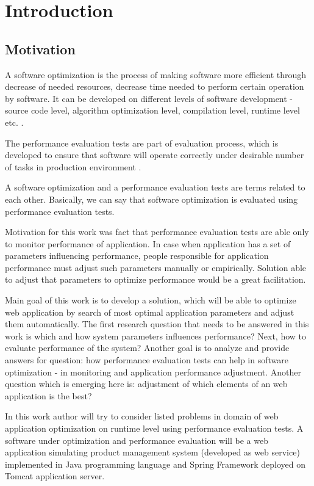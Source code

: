 \documentclass[12pt,a4paper]{article}
\begin{document}

\section{Introduction} \label{section:introduction}

\subsection{Motivation}

A software optimization is the process of making software more efficient through decrease of needed resources, decrease time needed to perform certain operation by software. It can be developed on different levels of software development - source code level, algorithm optimization level, compilation level, runtime level etc. \cite{javaperformance}\cite{optimizationtheory}.

The performance evaluation tests are part of evaluation process, which is developed to ensure that software will operate correctly under desirable number of tasks in production environment \cite{analysisofpet}.   

A software optimization and a performance evaluation tests are terms related to each other. Basically, we can say that software optimization is evaluated using performance evaluation tests. 

Motivation for this work was fact that performance evaluation tests are able only to monitor performance of application. In case when application has a set of parameters influencing performance, people responsible for application performance must adjust such parameters manually or empirically. Solution able to adjust that parameters to optimize performance would be a great facilitation. 

Main goal of this work is to develop a solution, which will be able to optimize web application by search of most optimal application parameters and adjust them automatically. The first research question that needs to be answered in this work is which and how system parameters influences performance? Next, how to evaluate performance of the system? Another goal is to analyze and provide answers for question: how performance evaluation tests can help in software optimization - in monitoring and application performance adjustment. Another question which is emerging here is: adjustment of which elements of an web application is the best? 

In this work author will try to consider listed problems in domain of web application optimization on runtime level using performance evaluation tests. A software under optimization and performance evaluation will be a web application simulating product management system (developed as web service) implemented in Java programming language and Spring Framework deployed on Tomcat application server. 
\end{document}
